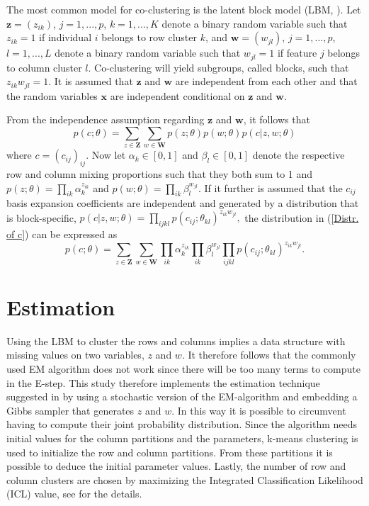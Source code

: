 \documentclass[12pt,a4paper]{article}
\begin{document}
The most common model for co-clustering is the latent block model (LBM, \cite{Govaert}). Let 
$
\mathbf{z} = (z_{ik})$, $j = 1,..., p
$,
$k = 1,..., K$ denote a binary random variable such that $z_{ik} = 1$ if individual $i$ belongs to row cluster $k$, and $\mathbf{w} = (w_{jl})$, $j = 1,..., p$, $l = 1,..., L$ denote a binary random variable such that $w_{jl} = 1$ if feature $j$ belongs to column cluster $l$. Co-clustering will yield subgroups, called blocks, such that $z_{ik} w_{jl} = 1$. It is assumed that $\mathbf{z}$ and $\mathbf{w}$ are independent from each other and that the random variables $\mathbf{x}$ are independent conditional on $\mathbf{z}$ and $\mathbf{w}$. 

From the independence assumption regarding $\mathbf{z}$ and $\mathbf{w}$, it follows that 
%
\begin{equation}\label{Distr. of c}
	p(c; \theta) = \sum_{z \in \mathbf{Z}} \sum_{w \in \mathbf{W}} p(z; \theta) p(w; \theta) p(c|z, w; \theta)
\end{equation}  
% 
where $c = (c_{ij})_{ij}$. Now let $\alpha_k \in [0,1]$ and $\beta_l \in [0,1]$ denote the respective row and column mixing proportions such that they both sum to 1 and 
$
p(z; \theta) = \prod_{ik} \alpha_k^{z_{ik}} 
$
and 
$
p(w; \theta) = \prod_{ik} \beta_l^{w_{jl}}. 
$
If it further is assumed that the $c_{ij}$ basis expansion coefficients are independent and generated by a distribution that is block-specific,
$
p(c|z, w; \theta) = \prod_{ijkl} p(c_{ij}; \theta_{kl})^{z_{ik} w_{jl}},
$
the distribution in (\ref{Distr. of c}) can be expressed as
%
\begin{equation}
	p(c; \theta) = \sum_{z \in \mathbf{Z}} \sum_{w \in \mathbf{W}} \prod_{ik} \alpha_k^{z_{ik}} \prod_{ik} \beta_l^{w_{jl}} \prod_{ijkl} p(c_{ij}; \theta_{kl})^{z_{ik} w_{jl}}.
\end{equation}

\section{Estimation}
Using the LBM to cluster the rows and columns implies a data structure with missing values on two variables, $z$ and $w$. It therefore follows that the commonly used EM algorithm does not work since there will be too many terms to compute in the E-step. This study therefore implements the estimation technique suggested in \cite{Bouveyron} by using a stochastic version of the EM-algorithm and embedding a Gibbs sampler that generates $z$ and $w$. In this way it is possible to circumvent having to compute their joint probability distribution. Since the algorithm needs initial values for the column partitions and the parameters, k-means clustering is used to initialize the row and column partitions. From these partitions it is possible to deduce the initial parameter values. Lastly, the number of row and column clusters are chosen by maximizing the Integrated Classification Likelihood (ICL) value, see \cite{Bouveyron} for the details.
\end{document}
